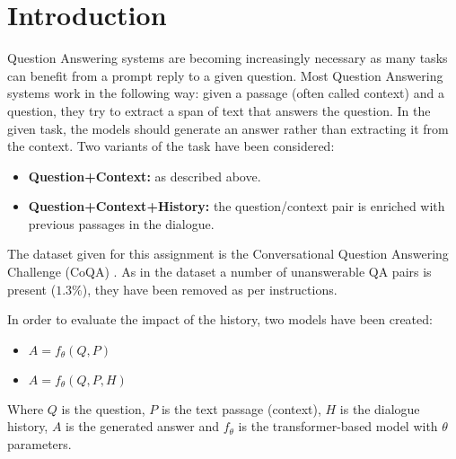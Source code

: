 \documentclass[11pt]{article}
\begin{document}
\section{Introduction}
\label{sec:introduction}
Question Answering systems are becoming increasingly necessary as many tasks can benefit from a prompt reply to a given question.
Most Question Answering systems work in the following way: given a passage (often called context) and a question, they try to extract a span of text that answers the question.
In the given task, the models should generate an answer rather than extracting it from the context. Two variants of the task have been considered:
\begin{itemize}
\item \textbf{Question+Context:} as described above.
\item \textbf{Question+Context+History:} the question/context pair is enriched with previous passages in the dialogue.
\end{itemize}

The dataset given for this assignment is the Conversational Question Answering Challenge (CoQA) \cite{Reddy2018}. As in the dataset a number of unanswerable QA pairs is present ($1.3\%$), they have been removed as per instructions.

In order to evaluate the impact of the history, two models have been created:
\begin{itemize}
\item $A = f_\theta(Q,P)$
\item $A = f_\theta(Q,P,H)$
\end{itemize}
Where $Q$ is the question, $P$ is the text passage (context), $H$ is the dialogue history, $A$ is the generated answer and $f_\theta$ is the transformer-based model with $\theta$ parameters.



\end{document}
